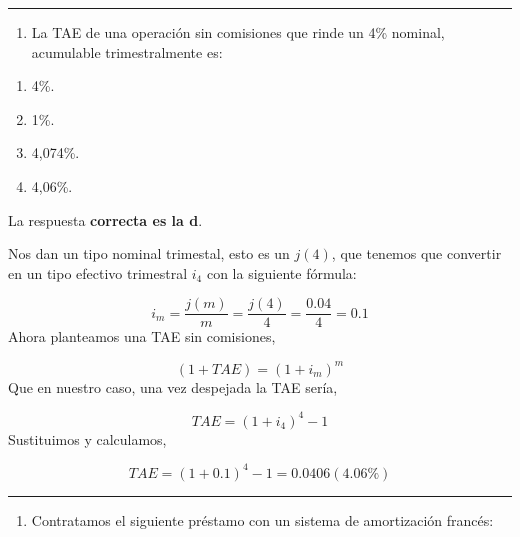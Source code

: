 \documentclass[
  letterpaper,
  DIV=11,
  numbers=noendperiod]{scrreprt}
\providecommand{\tightlist}{%
  \setlength{\itemsep}{0pt}\setlength{\parskip}{0pt}}\usepackage{longtable,booktabs,array}
\begin{document}
\begin{center}\rule{0.5\linewidth}{0.5pt}\end{center}

\begin{enumerate}
\def\labelenumi{\arabic{enumi}.}
\setcounter{enumi}{45}
\tightlist
\item
  La TAE de una operación sin comisiones que rinde un 4\% nominal,
  acumulable trimestralmente es:
\end{enumerate}

\begin{enumerate}
\def\labelenumi{\alph{enumi})}
\item
  4\%.
\item
  1\%.
\item
  4,074\%.
\item
  4,06\%.
\end{enumerate}

\begin{tcolorbox}[enhanced jigsaw, left=2mm, opacityback=0, colback=white, breakable, arc=.35mm, bottomrule=.15mm, rightrule=.15mm, toprule=.15mm, leftrule=.75mm, colframe=quarto-callout-tip-color-frame]
\begin{minipage}[t]{5.5mm}
\textcolor{quarto-callout-tip-color}{\faLightbulb}
\end{minipage}%
\begin{minipage}[t]{\textwidth - 5.5mm}

La respuesta \textbf{correcta es la d}.

Nos dan un tipo nominal trimestal, esto es un \(j(4)\), que tenemos que
convertir en un tipo efectivo trimestral \(i_4\) con la siguiente
fórmula:

\[i_m=\frac{j\left(m\right)}{m}=\frac{j\left(4\right)}{4}=\frac{0.04}{4}=0.1\]
Ahora planteamos una TAE sin comisiones,

\[\left(1+TAE\right)=\left(1+i_m\right)^m\] Que en nuestro caso, una vez
despejada la TAE sería,

\[TAE=\left(1+i_4\right)^4-1\] Sustituimos y calculamos,

\[TAE=\left(1+0.1\right)^4-1=0.0406(4.06\%)\]

\end{minipage}%
\end{tcolorbox}

\begin{center}\rule{0.5\linewidth}{0.5pt}\end{center}

\begin{enumerate}
\def\labelenumi{\arabic{enumi}.}
\setcounter{enumi}{46}
\tightlist
\item
  Contratamos el siguiente préstamo con un sistema de amortización
  francés:
\end{enumerate}
\end{document}
